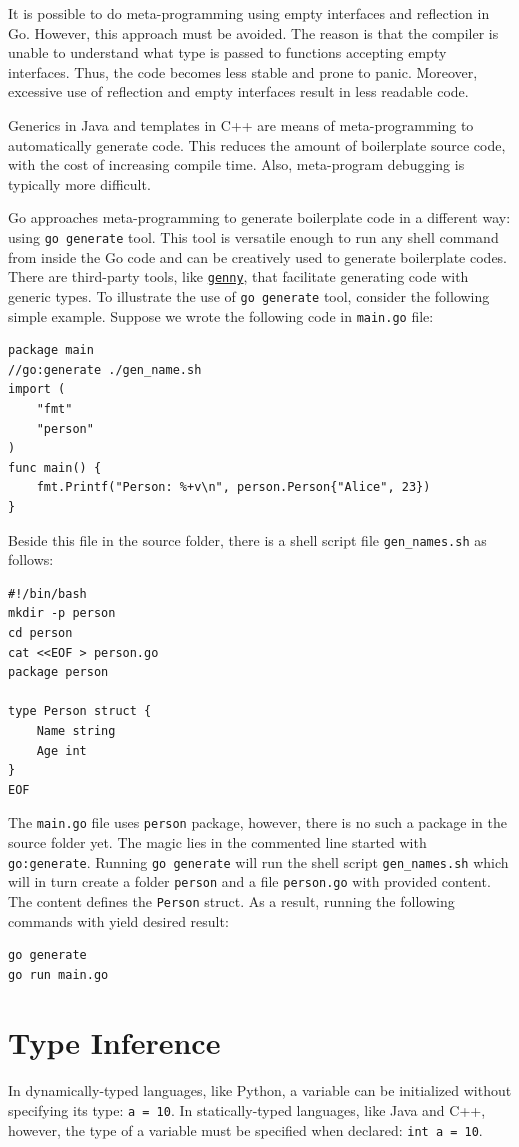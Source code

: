 \documentclass[11pt]{article}
\begin{document}
It is possible to do meta-programming using empty interfaces and reflection in Go. However, this approach must be avoided. The reason is that the compiler is unable to understand what type is passed to functions accepting empty interfaces. Thus, the code becomes less stable and prone to panic. Moreover, excessive use of reflection and empty interfaces result in less readable code.

Generics in Java and templates in C++ are means of meta-programming to automatically generate code. This reduces the amount of boilerplate source code, with the cost of increasing compile time. Also, meta-program debugging is typically more difficult.

Go approaches meta-programming to generate boilerplate code in a different way: using \texttt{go generate} tool. This tool is versatile enough to run any shell command from inside the Go code and can be creatively used to generate boilerplate codes. There are third-party tools, like \href{https://github.com/cheekybits/genny}{\texttt{genny}}, that facilitate generating code with generic types. To illustrate the use of \texttt{go generate} tool, consider the following simple example. Suppose we wrote the following code in \texttt{main.go} file:
\begin{verbatim}
package main
//go:generate ./gen_name.sh
import (
    "fmt"
    "person"
)
func main() {
    fmt.Printf("Person: %+v\n", person.Person{"Alice", 23})
}
\end{verbatim}
Beside this file in the source folder, there is a shell script file \texttt{gen\_names.sh} as follows:
\begin{verbatim}
#!/bin/bash
mkdir -p person
cd person
cat <<EOF > person.go
package person

type Person struct {
    Name string
    Age int
}
EOF
\end{verbatim}
The \texttt{main.go} file uses \texttt{person} package, however, there is no such a package in the source folder yet. The magic lies in the commented line started with \texttt{go:generate}. Running \texttt{go generate} will run the shell script \texttt{gen\_names.sh} which will in turn create a folder \texttt{person} and a file \texttt{person.go} with provided content. The content defines the \texttt{Person} struct. As a result, running the following commands with yield desired result:
\begin{verbatim}
go generate
go run main.go
\end{verbatim}

\section*{Type Inference}
\label{sec:orgheadline14}
In dynamically-typed languages, like Python, a variable can be initialized without specifying its type: \texttt{a = 10}. In statically-typed languages, like Java and C++, however, the type of a variable must be specified when declared: \texttt{int a = 10}.
\end{document}
